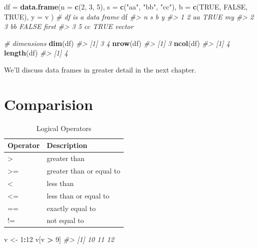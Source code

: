 \documentclass[]{book}
\newenvironment{Shaded}{\begin{snugshade}}{\end{snugshade}}
\newcommand{\CommentTok}[1]{\textcolor[rgb]{0.56,0.35,0.01}{\textit{#1}}}
\newcommand{\DataTypeTok}[1]{\textcolor[rgb]{0.13,0.29,0.53}{#1}}
\newcommand{\DecValTok}[1]{\textcolor[rgb]{0.00,0.00,0.81}{#1}}
\newcommand{\KeywordTok}[1]{\textcolor[rgb]{0.13,0.29,0.53}{\textbf{#1}}}
\newcommand{\NormalTok}[1]{#1}
\newcommand{\OperatorTok}[1]{\textcolor[rgb]{0.81,0.36,0.00}{\textbf{#1}}}
\newcommand{\OtherTok}[1]{\textcolor[rgb]{0.56,0.35,0.01}{#1}}
\newcommand{\StringTok}[1]{\textcolor[rgb]{0.31,0.60,0.02}{#1}}
\theoremstyle{definition}
\theoremstyle{definition}
\theoremstyle{definition}
\theoremstyle{remark}
\begin{document}
\begin{Shaded}
\begin{Highlighting}[]
\NormalTok{df =}\StringTok{ }\KeywordTok{data.frame}\NormalTok{(}\DataTypeTok{n =} \KeywordTok{c}\NormalTok{(}\DecValTok{2}\NormalTok{, }\DecValTok{3}\NormalTok{, }\DecValTok{5}\NormalTok{),}
                \DataTypeTok{s =} \KeywordTok{c}\NormalTok{(}\StringTok{"aa"}\NormalTok{, }\StringTok{"bb"}\NormalTok{, }\StringTok{"cc"}\NormalTok{),}
                \DataTypeTok{b =} \KeywordTok{c}\NormalTok{(}\OtherTok{TRUE}\NormalTok{, }\OtherTok{FALSE}\NormalTok{, }\OtherTok{TRUE}\NormalTok{),}
                \DataTypeTok{y =}\NormalTok{ v}
\NormalTok{                )       }\CommentTok{# df is a data frame }
\NormalTok{df}
\CommentTok{#>   n  s     b      y}
\CommentTok{#> 1 2 aa  TRUE     my}
\CommentTok{#> 2 3 bb FALSE  first}
\CommentTok{#> 3 5 cc  TRUE vector}

\CommentTok{# dimensions}
\KeywordTok{dim}\NormalTok{(df)}
\CommentTok{#> [1] 3 4}
\KeywordTok{nrow}\NormalTok{(df)}
\CommentTok{#> [1] 3}
\KeywordTok{ncol}\NormalTok{(df)}
\CommentTok{#> [1] 4}
\KeywordTok{length}\NormalTok{(df)}
\CommentTok{#> [1] 4}
\end{Highlighting}
\end{Shaded}

We'll discuss data frames in greater detail in the next chapter.

\hypertarget{comparision}{%
\section{Comparision}\label{comparision}}

\begin{table}

\caption{\label{tab:table-logicalOps}Logical Operators}
\centering
\begin{tabular}[t]{ll}
\toprule
Operator & Description\\
\midrule
> & greater than\\
>= & greater than or equal to\\
< & less than\\
<= & less than or equal to\\
== & exactly equal to\\
!= & not equal to\\
\bottomrule
\end{tabular}
\end{table}

\begin{Shaded}
\begin{Highlighting}[]
\NormalTok{v <-}\StringTok{ }\DecValTok{1}\OperatorTok{:}\DecValTok{12}
\NormalTok{v[v }\OperatorTok{>}\StringTok{ }\DecValTok{9}\NormalTok{]}
\CommentTok{#> [1] 10 11 12}
\end{Highlighting}
\end{Shaded}
\end{document}
